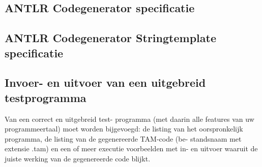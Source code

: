 \documentclass[]{article}
\begin{document}
\newpage
\subsection{ANTLR Codegenerator specificatie}


\begin{landscape}
\newpage
\subsection{ANTLR Codegenerator Stringtemplate specificatie}

\end{landscape}

\newpage
\subsection{Invoer- en uitvoer van een uitgebreid testprogramma}
Van een correct en uitgebreid test-
programma (met daarin alle features van uw programmeertaal) moet worden bijgevoegd: de
listing van het oorspronkelijk programma, de listing van de gegenereerde TAM-code (be-
standsnaam met extensie .tam) en een of meer executie voorbeelden met in- en uitvoer
waaruit de juiste werking van de gegenereerde code blijkt.
\end{document}
